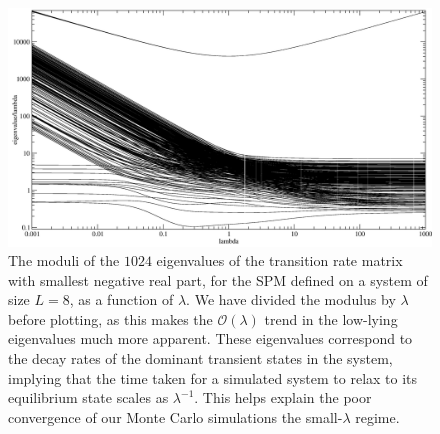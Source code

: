 \documentclass[
reprint, amsmath,amssymb,
]{revtex4-1}
\begin{document}
\begin{figure}[h!]
\vspace{0em}
\begin{center}
    \includegraphics[width=1\linewidth]{bigAccSpectrum}
\end{center}
    \vspace{-0em}
\caption{\label{fig:eigenspec} The moduli of the $1024$ eigenvalues of the transition rate matrix with smallest negative real part, for the SPM defined on a system of size $L=8$, as a function of $\lambda$.
We have divided the modulus by $\lambda$ before plotting, as this makes the $\mathcal{O}(\lambda)$ trend in the low-lying eigenvalues much more apparent. These eigenvalues correspond to the decay rates
of the dominant transient states in the system, implying that the time taken for a simulated system to relax
to its equilibrium state scales as $\lambda^{-1}$. This helps explain the poor convergence of our Monte Carlo simulations the small-$\lambda$ regime.}
\end{figure}
\end{document}
